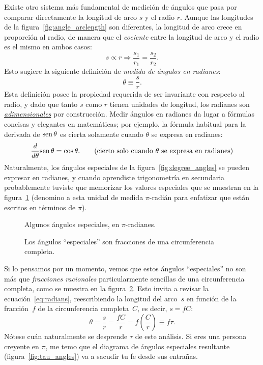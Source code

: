 Existe otro sistema más fundamental de medición de ángulos que pasa por comparar directamente la longitud de arco $s$ y el radio $r$. Aunque las longitudes de la figura~\ref{fig:angle_arclength} son diferentes, la longitud de arco crece en proporción al radio, de manera que el \emph{cociente} entre la longitud de arco y el radio es el mismo en ambos casos:
\[
s\propto r \Rightarrow \frac{s_1}{r_1} = \frac{s_2}{r_2}.
\]
Esto sugiere la siguiente definición de  \emph{medida de ángulos en radianes}:
\begin{equation}
\label{eq:radians}
\theta \equiv \frac{s}{r}.
\end{equation}
Esta definición posee la propiedad requerida de ser invariante con respecto al radio, y dado que tanto  $s$ como $r$ tienen unidades de longitud, los radianes son  \href{https://es.wikipedia.org/wiki/Magnitud_adimensional}{\emph{adimensionales}} por construcción. Medir ángulos en radianes da lugar a fórmulas concisas y elegantes en matemáticas; por ejemplo, la fórmula habitual para la derivada de  $\mbox{sen}\,\theta$ es cierta solamente cuando  $\theta$ se expresa en radianes:
\[
  \frac{d}{d\theta}\mbox{sen}\,\theta = \cos\theta. \qquad\mbox{(cierto solo cuando $\theta$ se expresa en radianes)}
\]
Naturalmente, los ángulos especiales de la figura~\ref{fig:degree_angles} se pueden expresar en radianes, y cuando aprendiste trigonometría en secundaria probablemente tuviste que memorizar los valores especiales que se muestran en la figura~\ref{fig:pi_angles} (denomino a esta unidad de medida $\pi$-radián para enfatizar que están escritos en términos de $\pi$).

\begin{figure}
\begin{center}
\end{center}
\caption{Algunos ángulos especiales, en $\pi$-radianes.\label{fig:pi_angles}}
\end{figure}

\begin{figure}
\begin{center}
\end{center}
\caption{Los ángulos ``especiales'' son fracciones de una circunferencia completa.\label{fig:angle_fractions}}
\end{figure}

Si lo pensamos por un momento, vemos que estos ángulos ``especiales'' no son más que  \emph{fracciones racionales} particularmente sencillas de una circunferencia completa, como se muestra en la figura~\ref{fig:angle_fractions}. Esto invita a revisar la ecuación~\eqref{eq:radians}, reescribiendo la longitud del arco~$s$ en función de la fracción~$f$ de la circunferencia completa~$C$, es decir, $s = f C$:
\[ \theta = \frac{s}{r} = \frac{fC}{r} =  f\left(\frac{C}{r}\right) \equiv f\tau. \]
Nótese cuán naturalmente se desprende $\tau$ de este análisis. Si eres una persona creyente en $\pi$, me temo que el diagrama  de ángulos especiales resultante (figura~\ref{fig:tau_angles}) va a sacudir tu fe desde sus entrañas.

